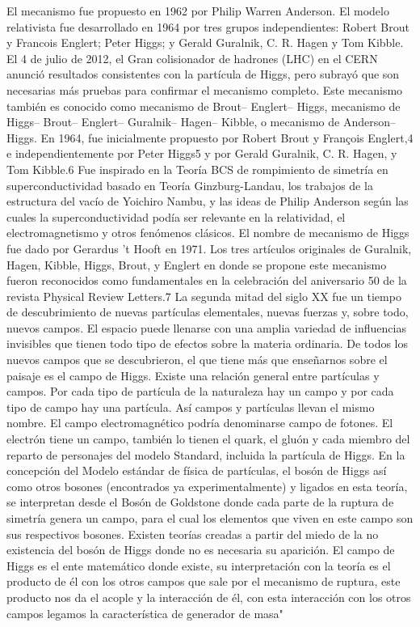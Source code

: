\documentclass[a4paper,12pt,twoside]{book}
\begin{document}
El mecanismo fue propuesto en 1962 por Philip Warren Anderson. El modelo relativista fue desarrollado en 1964 por tres grupos independientes: Robert Brout y Francois Englert; Peter Higgs; y Gerald Guralnik, C. R. Hagen y Tom Kibble. El 4 de julio de 2012, el Gran colisionador de hadrones (LHC) en el CERN anunció resultados consistentes con la partícula de Higgs, pero subrayó que son necesarias más pruebas para confirmar el mecanismo completo.
Este mecanismo también es conocido como mecanismo de Brout– Englert– Higgs, mecanismo de Higgs– Brout– Englert– Guralnik– Hagen– Kibble, o mecanismo de Anderson–Higgs. En 1964, fue inicialmente propuesto por Robert Brout y François Englert,4 e independientemente por Peter Higgs5 y por Gerald Guralnik, C. R. Hagen, y Tom Kibble.6 Fue inspirado en la Teoría BCS de rompimiento de simetría en superconductividad basado en Teoría Ginzburg-Landau, los trabajos de la estructura del vacío de Yoichiro Nambu, y las ideas de Philip Anderson según las cuales la superconductividad podía ser relevante en la relatividad, el electromagnetismo y otros fenómenos clásicos. El nombre de mecanismo de Higgs fue dado por Gerardus 't Hooft en 1971. Los tres artículos originales de Guralnik, Hagen, Kibble, Higgs, Brout, y Englert en donde se propone este mecanismo fueron reconocidos como fundamentales en la celebración del aniversario 50 de la revista Physical Review Letters.7
La segunda mitad del siglo XX fue un tiempo de descubrimiento de nuevas partículas elementales, nuevas fuerzas y, sobre todo, nuevos campos. El espacio puede llenarse con una amplia variedad de influencias invisibles que tienen todo tipo de efectos sobre la materia ordinaria. De todos los nuevos campos que se descubrieron, el que tiene más que enseñarnos sobre el paisaje es el campo de Higgs. Existe una relación general entre partículas y campos. Por cada tipo de partícula de la naturaleza hay un campo y por cada tipo de campo hay una partícula. Así campos y partículas llevan el mismo nombre. El campo electromagnético podría denominarse campo de fotones. El electrón tiene un campo, también lo tienen el quark, el gluón y cada miembro del reparto de personajes del modelo Standard, incluida la partícula de Higgs.
En la concepción del Modelo estándar de física de partículas, el bosón de Higgs así como otros bosones (encontrados ya experimentalmente) y ligados en esta teoría, se interpretan desde el Bosón de Goldstone donde cada parte de la ruptura de simetría genera un campo, para el cual los elementos que viven en este campo son sus respectivos bosones. Existen teorías creadas a partir del miedo de la no existencia del bosón de Higgs donde no es necesaria su aparición. El campo de Higgs es el ente matemático donde existe, su interpretación con la teoría es el producto de él con los otros campos que sale por el mecanismo de ruptura, este producto nos da el acople y la interacción de él, con esta interacción con los otros campos legamos la característica de generador de masa"
\end{document}

